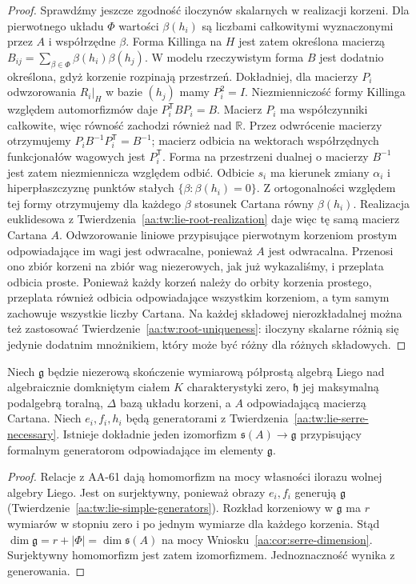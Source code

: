 \begin{proof}
Sprawdźmy jeszcze zgodność iloczynów skalarnych w realizacji korzeni. Dla pierwotnego układu $\Phi$ wartości $\beta(h_i)$ są liczbami całkowitymi wyznaczonymi przez $A$ i współrzędne $\beta$. Forma Killinga na $H$ jest zatem określona macierzą
$B_{ij}=\sum_{\beta\in\Phi}\beta(h_i)\beta(h_j)$.
W modelu rzeczywistym forma $B$ jest dodatnio określona, gdyż korzenie rozpinają przestrzeń. Dokładniej, dla macierzy $P_i$ odwzorowania $R_i|_H$ w bazie $(h_j)$ mamy $P_i^2=I$. Niezmienniczość formy Killinga względem automorfizmów daje $P_i^{\mathsf T}BP_i=B$. Macierz $P_i$ ma współczynniki całkowite, więc równość zachodzi również nad $\mathbb R$. Przez odwrócenie macierzy otrzymujemy $P_i B^{-1}P_i^{\mathsf T}=B^{-1}$; macierz odbicia na wektorach współrzędnych funkcjonałów wagowych jest $P_i^{\mathsf T}$. Forma na przestrzeni dualnej o macierzy $B^{-1}$ jest zatem niezmiennicza względem odbić. Odbicie $s_i$ ma kierunek zmiany $\alpha_i$ i hiperpłaszczyznę punktów stałych $\{\beta:\beta(h_i)=0\}$. Z ortogonalności względem tej formy otrzymujemy dla każdego $\beta$ stosunek Cartana równy $\beta(h_i)$. Realizacja euklidesowa z Twierdzenia~\ref{aa:tw:lie-root-realization} daje więc tę samą macierz Cartana $A$. Odwzorowanie liniowe przypisujące pierwotnym korzeniom prostym odpowiadające im wagi jest odwracalne, ponieważ $A$ jest odwracalna. Przenosi ono zbiór korzeni na zbiór wag niezerowych, jak już wykazaliśmy, i przeplata odbicia proste. Ponieważ każdy korzeń należy do orbity korzenia prostego, przeplata również odbicia odpowiadające wszystkim korzeniom, a tym samym zachowuje wszystkie liczby Cartana. Na każdej składowej nierozkładalnej można też zastosować Twierdzenie~\ref{aa:tw:root-uniqueness}: iloczyny skalarne różnią się jedynie dodatnim mnożnikiem, który może być różny dla różnych składowych.
\end{proof}

\begin{twierdzenie}
\label{aa:tw:serre-presentation}
Niech $\mathfrak g$ będzie niezerową skończenie wymiarową półprostą algebrą Liego nad algebraicznie domkniętym ciałem $K$ charakterystyki zero, $\mathfrak h$ jej maksymalną podalgebrą toralną, $\Delta$ bazą układu korzeni, a $A$ odpowiadającą macierzą Cartana. Niech $e_i,f_i,h_i$ będą generatorami z Twierdzenia~\ref{aa:tw:lie-serre-necessary}. Istnieje dokładnie jeden izomorfizm $\mathfrak s(A)\to\mathfrak g$ przypisujący formalnym generatorom odpowiadające im elementy $\mathfrak g$.
\end{twierdzenie}
\begin{proof}
Relacje z AA-61 dają homomorfizm na mocy własności ilorazu wolnej algebry Liego. Jest on surjektywny, ponieważ obrazy $e_i,f_i$ generują $\mathfrak g$ (Twierdzenie~\ref{aa:tw:lie-simple-generators}). Rozkład korzeniowy w $\mathfrak g$ ma $r$ wymiarów w stopniu zero i po jednym wymiarze dla każdego korzenia. Stąd
$\dim\mathfrak g=r+|\Phi|=\dim\mathfrak s(A)$
na mocy Wniosku~\ref{aa:cor:serre-dimension}. Surjektywny homomorfizm jest zatem izomorfizmem. Jednoznaczność wynika z generowania.
\end{proof}

